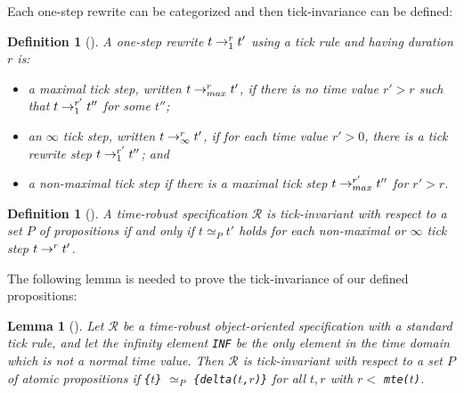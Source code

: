 \documentclass[journal]{IEEEtranTIE}
\newtheorem{lemma}[theorem]{Lemma}
\newtheorem{definition}[theorem]{Definition}
\begin{document}
Each one-step rewrite can be categorized and then tick-invariance can
be defined:
\begin{definition}[\cite{DBLP:journals/entcs/OlveczkyM07a}]
A one-step rewrite $t\rightarrow^{r}_{1}t'$ using a tick rule and having
duration $r$ is:
\begin{itemize}
\item[--] a \emph{maximal tick step}, written $t\rightarrow^{r}_{max}t'$, if
  there is no time value $r'>r$ such that $t\rightarrow^{r'}_{1}t''$ for some
  $t''$;
\item[--] an \emph{$\infty$ tick step}, written $t\rightarrow^{r}_{\infty}t'$,
  if for each time value $r'>0$, there is a tick rewrite step
  $t\rightarrow^{r'}_{1}t''$; and
\item[--] a \emph{non-maximal tick step} if there is a maximal tick
  step $t\rightarrow^{r'}_{max}t''$ for $r'>r$.
\end{itemize}
\end{definition}
\begin{definition}[\cite{DBLP:journals/entcs/OlveczkyM07a}]
  A time-robust specification $\mathcal{R}$ is \emph{tick-invariant} with
  respect to a set $P$ of propositions if and only if $t\simeq_P t'$
  holds for each non-maximal or $\infty$ tick step $t\rightarrow^{r}_{}t'$.
\end{definition}

The following lemma is needed to prove the tick-invariance of our
defined propositions:
\begin{lemma}[\cite{DBLP:journals/entcs/OlveczkyM07a}]
\label{l:tickinv}
Let $\mathcal{R}$ be a time-robust object-oriented specification with a
standard tick rule, and let the infinity element \verb|INF| be the
only element in the time domain which is not a normal time value.
Then $\mathcal{R}$ is tick-invariant with respect to a set $P$ of atomic
propositions if \verb|{|$t$\verb|}| $\simeq_P$
\verb|{delta(|$t$\verb|,|$r$\verb|)}| for all $t,r$ with $r<$
\verb|mte(|$t$\verb|)|.
\end{lemma}

\newcommand{\mteTask}[2]{\texttt{mteTask(}#1\texttt{,}#2\texttt{)}}
\newcommand{\deltaTask}[3]{\texttt{deltaTask(}#1\texttt{,}#2\texttt{,}#3\texttt{)}}
\newcommand{\mteIS}[1]{\texttt{mteIS(}#1\texttt{)}}
\newcommand{\deltaIS}[2]{\texttt{deltaIS(}#1\texttt{,}#2\texttt{)}}
\newcommand{\IntSrc}[3]{\texttt{<}#1\texttt{:IntSrc|val:}#2\texttt{,cycle:}#3\texttt{>}}
\newcommand{\mteIr}[1]{\texttt{mteIr(}#1\texttt{)}}
\newcommand{\mteS}[1]{\texttt{mte(}#1\texttt{)}}
\newcommand{\deltaS}[2]{\texttt{delta(}#1\texttt{,}#2\texttt{)}}
 
\end{document}
